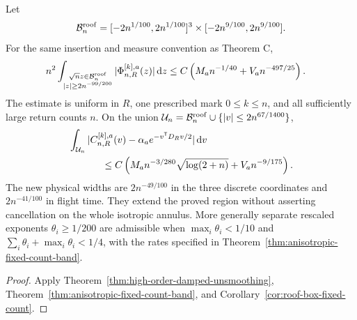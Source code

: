 \begin{maintheorem}
\label{thm:intro-anisotropic-band}
Let
\[
 \mathcal B_n^{\rm roof}
   =[-2n^{1/100},2n^{1/100}]^3
                         \times[-2n^{9/100},2n^{9/100}].
\]
For the same insertion and measure convention as Theorem C,
\begin{align*}
 &n^2\int_{\substack{\sqrt n z\in\mathcal B_n^{\rm roof}\\
                            |z|\ge2n^{-99/200}}}
                  |\Phi^{[k],a}_{n,R}(z)|\,\mathrm d z
       \le C\left(M_an^{-1/40}+V_an^{-497/25}\right).
\end{align*}
The estimate is uniform in $R$, one prescribed mark $0\le k\le n$,
and all sufficiently large return counts $n$. On the union
$\mathcal U_n=\mathcal B_n^{\rm roof}\cup\{|v|\le2n^{67/1400}\}$,
\begin{align*}
 &\int_{\mathcal U_n}
 |C^{[k],a}_{n,R}(v)-\alpha_a e^{-v^{\mathsf T}D_Rv/2}|\dd v\\
 &\hspace{12mm}\le C\left(M_an^{-3/280}\sqrt{\log(2+n)}
                                      +V_an^{-9/175}\right).
\end{align*}
The new physical widths are $2n^{-49/100}$ in the three discrete
coordinates and $2n^{-41/100}$ in flight time. They extend the proved
region without asserting cancellation on the whole isotropic annulus.
More generally separate rescaled exponents $\theta_i\ge1/200$ are
admissible when $\max_i\theta_i<1/10$ and
$\sum_i\theta_i+\max_i\theta_i<1/4$, with the rates specified in
Theorem~\ref{thm:anisotropic-fixed-count-band}.
\end{maintheorem}
\begin{proof}
Apply Theorem~\ref{thm:high-order-damped-unsmoothing},
Theorem~\ref{thm:anisotropic-fixed-count-band}, and
Corollary~\ref{cor:roof-box-fixed-count}.
\end{proof}

